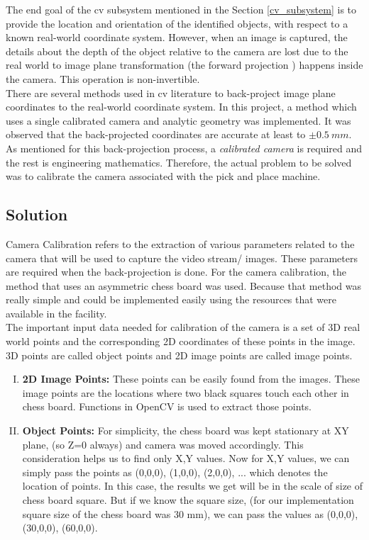 \documentclass[a4paper,12pt]{report}%
\begin{document}
The end goal of the \ac{cv} subsystem mentioned in the Section \ref{cv_subsystem} is to provide the location and orientation of the identified objects, with respect to a known real-world coordinate system. However, when an image is captured, the details about the depth of the object relative to the camera are lost due to the real world to image plane transformation (the forward projection \cite{hartley_zisserman_2004}) happens inside the camera. This operation is non-invertible.\\

There are several methods used in \ac{cv}  literature to back-project image plane coordinates to the real-world coordinate system. In this project, a method which uses a single calibrated camera and analytic geometry was implemented. It was observed that the back-projected coordinates are accurate at least to $\pm 0.5 ~mm$. As mentioned for this back-projection process, a \textit{calibrated camera} is required and the rest is engineering mathematics. Therefore, the actual problem to be solved was to calibrate the camera associated with the pick and place machine.



\subsection{Solution}
Camera Calibration refers to the extraction of various parameters related to the camera that will be used to capture the video stream/ images. These parameters are required when the back-projection is done. For the camera calibration, the method that uses an asymmetric chess board was used\cite{cam_calib:_nodate}. Because that method was really simple and could be implemented easily using the resources that were available in the facility.\\


The important input data needed for calibration of the camera is a set of 3D real world points and the corresponding 2D coordinates of these points in the image. 3D points are called object points and 2D image points are called image points.

\begin{enumerate}[I.]
	\item \textbf{2D Image Points:} These points can be easily found from the images. These image points are the locations where two black squares touch each other in chess board. Functions in OpenCV is used to extract those points\cite{cam_calib:_nodate}.
	
	\item \textbf{Object Points:}  For simplicity, the chess board was kept stationary at XY plane, (so Z=0 always) and camera was moved accordingly. This consideration helps us to find only X,Y values. Now for X,Y values, we can simply pass the points as (0,0,0), (1,0,0), (2,0,0), ... which denotes the location of points. In this case, the results we get will be in the scale of size of chess board square\cite{cam_calib:_nodate}. But if we know the square size, (for our implementation square size of the chess board was 30 mm), we can pass the values as (0,0,0), (30,0,0), (60,0,0).
\end{enumerate}
\end{document}
